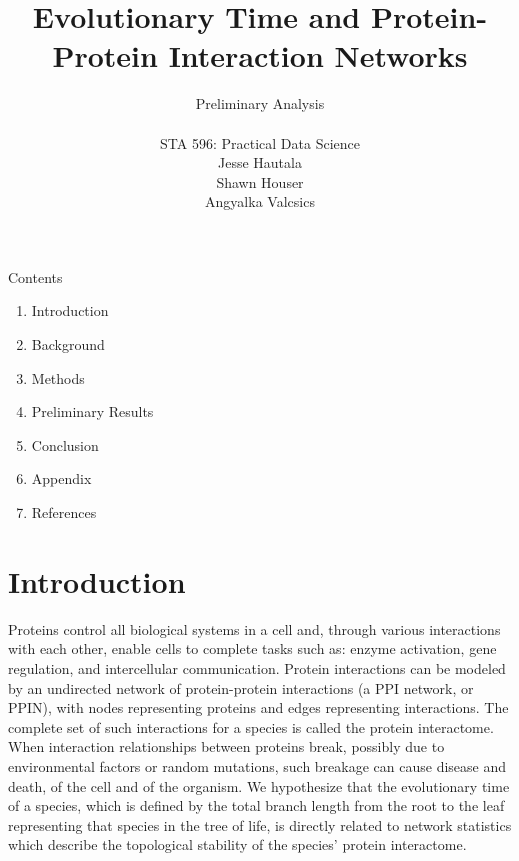 \documentclass[12pt]{article}
\begin{document}
\title{\textbf{Evolutionary Time and Protein-Protein Interaction Networks}}
\author{Preliminary Analysis \\ \\ STA 596: Practical Data Science \\ Jesse Hautala \\ Shawn Houser \\ Angyalka Valcsics }

	\maketitle
\onehalfspacing

\noindent Contents
\begin{enumerate}[label = \Roman{*}.]
\item Introduction
\item Background
\item Methods
\item Preliminary Results
\item Conclusion
\item Appendix
\item References\newline
\end{enumerate}

\section{Introduction}
Proteins control all biological systems in a cell and, through various interactions with each other, enable cells to complete tasks such as: enzyme activation, gene regulation, and intercellular communication. Protein interactions can be modeled by an undirected network of protein-protein interactions (a PPI network, or PPIN), with nodes representing proteins and edges representing interactions. The complete set of such interactions for a species is called the protein interactome. When interaction relationships between proteins break, possibly due to environmental factors or random mutations, such breakage can cause disease and death, of the cell and of the organism. We hypothesize that the evolutionary time of a species, which is defined by the total branch length from the root to the leaf representing that species in the tree of life, is directly related to network statistics which describe the topological stability of the species’ protein interactome.
\end{document}
